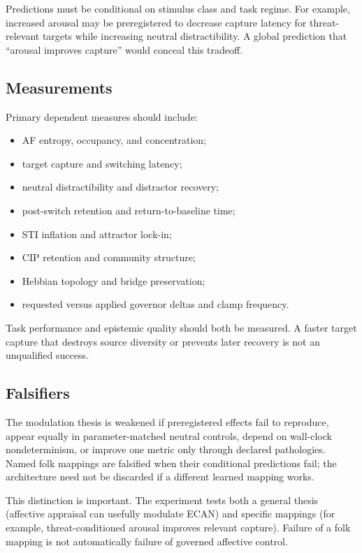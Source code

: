 \documentclass[11pt]{article}
\begin{document}
Predictions must be conditional on stimulus class and task regime.  For example,
increased arousal may be preregistered to decrease capture latency for
threat-relevant targets while increasing neutral distractibility.  A global
prediction that ``arousal improves capture'' would conceal this tradeoff.

\subsection{Measurements}

Primary dependent measures should include:
\begin{itemize}
  \item AF entropy, occupancy, and concentration;
  \item target capture and switching latency;
  \item neutral distractibility and distractor recovery;
  \item post-switch retention and return-to-baseline time;
  \item STI inflation and attractor lock-in;
  \item CIP retention and community structure;
  \item Hebbian topology and bridge preservation;
  \item requested versus applied governor deltas and clamp frequency.
\end{itemize}

Task performance and epistemic quality should both be measured.  A faster
target capture that destroys source diversity or prevents later recovery is not
an unqualified success.

\subsection{Falsifiers}

The modulation thesis is weakened if preregistered effects fail to reproduce,
appear equally in parameter-matched neutral controls, depend on wall-clock
nondeterminism, or improve one metric only through declared pathologies.  Named
folk mappings are falsified when their conditional predictions fail; the
architecture need not be discarded if a different learned mapping works.

This distinction is important.  The experiment tests both a general thesis
(affective appraisal can usefully modulate ECAN) and specific mappings (for
example, threat-conditioned arousal improves relevant capture).  Failure of a
folk mapping is not automatically failure of governed affective control.
\end{document}
